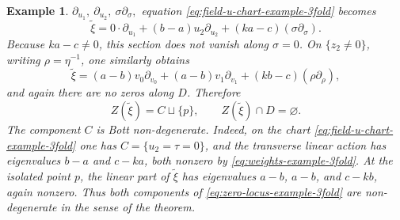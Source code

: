 \documentclass[12pt,a4paper,dvipsnames,x11names]{amsart}
\numberwithin{equation}{section}
\theoremstyle{plain}
\newtheorem{example}[theorem]{Example}
\theoremstyle{definition}
\theoremstyle{remark}
\begin{document}
\begin{example}
$
\partial_{u_1},\ \partial_{u_2},\ \sigma\partial_\sigma,
$
equation \eqref{eq:field-u-chart-example-3fold} becomes
$$
\widetilde\xi
=
0\cdot\partial_{u_1}
+
(b-a)u_2\partial_{u_2}
+
(ka-c)(\sigma\partial_\sigma).
$$
Because $ka-c\neq 0$, this section does not vanish along $\sigma=0$. On $\{z_2\neq 0\}$, writing $\rho=\eta^{-1}$, one similarly obtains
$$
\widetilde\xi
=
(a-b)v_0\partial_{v_0}
+
(a-b)v_1\partial_{v_1}
+
(kb-c)(\rho\partial_\rho),
$$
and again there are no zeros along $D$. Therefore
\begin{equation}\label{eq:zero-locus-example-3fold}
Z(\widetilde\xi)=C\sqcup\{p\},
\qquad
Z(\widetilde\xi)\cap D=\varnothing.
\end{equation}
The component $C$ is Bott non-degenerate. Indeed, on the chart \eqref{eq:field-u-chart-example-3fold} one has $C=\{u_2=\tau=0\}$, and the transverse linear action has eigenvalues $b-a$ and $c-ka$, both nonzero by \eqref{eq:weights-example-3fold}. At the isolated point $p$, the linear part of $\widetilde\xi$ has eigenvalues $a-b$, $a-b$, and $c-kb$, again nonzero. Thus both components of \eqref{eq:zero-locus-example-3fold} are non-degenerate in the sense of the theorem.


\end{example}
\end{document}
